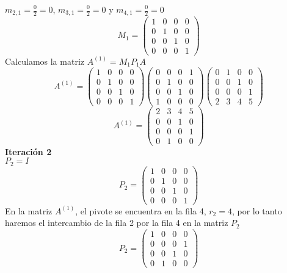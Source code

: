  $m_{2,1} = \frac{0}{2} = 0$, $m_{3,1} = \frac{0}{2} = 0$ y $m_{4,1} = \frac{0}{2} = 0$
 \[ M_1 =
    \left( \begin{array}{cccc}
    1 & 0 & 0 & 0\\
    0 & 1 & 0 & 0\\ 
    0 & 0 & 1 & 0\\ 
    0 & 0 & 0 & 1
    \end{array} \right) 
\]
Calculamos la matriz $A^{(1)} = M_{1}P_{1}A$
\[ A^{(1)} =
    \left( \begin{array}{cccc}
    1 & 0 & 0 & 0\\
    0 & 1 & 0 & 0\\ 
    0 & 0 & 1 & 0\\ 
    0 & 0 & 0 & 1
    \end{array} \right) 
    \left( \begin{array}{cccc}
    0 & 0 & 0 & 1\\
    0 & 1 & 0 & 0\\ 
    0 & 0 & 1 & 0\\ 
    1 & 0 & 0 & 0
    \end{array} \right)
    \left( \begin{array}{cccc}
    0 & 1 & 0 & 0\\
    0 & 0 & 1 & 0\\ 
    0 & 0 & 0 & 1\\ 
    2 & 3 & 4 & 5
    \end{array} \right) 
\]
\[ A^{(1)} =
    \left( \begin{array}{cccc}
    2 & 3 & 4 & 5\\
    0 & 0 & 1 & 0\\ 
    0 & 0 & 0 & 1\\ 
    0 & 1 & 0 & 0
    \end{array} \right) 
\]
\textbf{Iteración 2}\\
$P_2 = I$
\[ P_2 =
     \left( \begin{array}{cccc}
    1 & 0 & 0 & 0\\
    0 & 1 & 0 & 0\\ 
    0 & 0 & 1 & 0\\ 
    0 & 0 & 0 & 1
    \end{array} \right)
\]
En la matriz $A^{(1)}$, el pivote se encuentra en la fila 4, $r_2 = 4$, por lo tanto haremos el intercambio de la fila 2 por la fila 4 en la matriz $P_2$
\[ P_2 =
    \left( \begin{array}{cccc}
    1 & 0 & 0 & 0\\
    0 & 0 & 0 & 1\\ 
    0 & 0 & 1 & 0\\ 
    0 & 1 & 0 & 0
    \end{array} \right) 
\]
